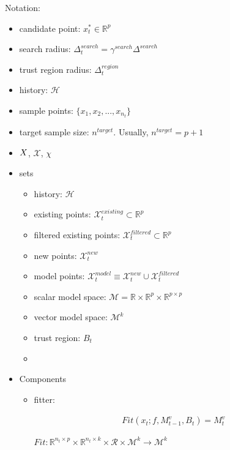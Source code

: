 Notation:
\begin{itemize}

    \item candidate point: $x^*_t\in\mathbb{R}^p$
    \item search radius: $\Delta_t^{search}=\gamma^{search}\Delta^{search}$
    \item trust region radius: $\Delta_t^{region}$
    \item history: $\mathcal{H}$
    \item sample points: $\{x_1, x_2,...,x_{n_t}\}$
    \item target sample size: $n^{target}$. Usually, $n^{target}=p+1$
    \item $X$, $\mathcal{X}$, $\chi$
\end{itemize}

\begin{itemize}
    \item sets
        \begin{itemize}
            \item history: $\mathcal{H}$
            \item existing points: $\mathcal{X}^{existing}_t\subset\mathbb{R}^{p}$
            \item filtered existing points: $\mathcal{X}^{filtered}_t\subset\mathbb{R}^{p}$
            \item new points: $\mathcal{X}^{new}_t$

            \item model points: $\mathcal{X}^{model}_t\equiv\mathcal{X}^{new}_t\cup\mathcal{X}^{filtered}_t$
            \item scalar model space: $\mathcal{M}= \mathbb{R}\times\mathbb{R}^p\times\mathbb{R}^{p\times p}$
            \item vector model space: $\mathcal{M}^k$
            \item trust region: $B_t$
            \item

        \end{itemize}
    \item Components
        \begin{itemize}
            \item fitter:

            \begin{align}
                Fit(x_t;f,M^v_{t-1},B_t)=M_{t}^v
            \end{align}

                    $Fit:\mathbb{R}^{n_t\times p}\times\mathbb{R}^{n_t\times k}\times\mathcal{R}\times\mathcal{M}^k\rightarrow\mathcal{M}^k$


\end{itemize}
\end{itemize}
